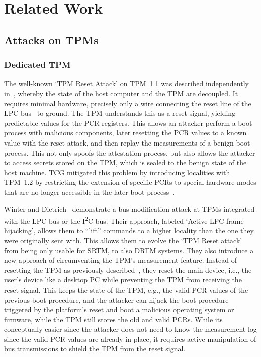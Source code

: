 
\chapter{Related Work}\label{chapter:related_work}

\section{Attacks on TPMs}

\subsection{Dedicated TPM}

The well-known `TPM Reset Attack' on TPM~1.1 was described independently in~\cite{kauerBernhard,sparks2007}, whereby the state of the host computer and the TPM are decoupled.
It requires minimal hardware, precisely only a wire connecting the reset line of the LPC bus~\cite{lpc} to ground.
The TPM understands this as a reset signal, yielding predictable values for the \ac{PCR} registers.
This allows an attacker perform a boot process with malicious components, later resetting the \ac{PCR} values to a known value with the reset attack, and then replay the measurements of a benign boot process.
This not only spoofs the attestation process, but also allows the attacker to access secrets stored on the TPM, which is sealed to the benign state of the host machine.
\ac{TCG} mitigated this problem by introducing localities with TPM~1.2 by restricting the extension of specific \acp{PCR} to special hardware modes that are no longer accessible in the later boot process~\cite{tpmResetMitigation}.

Winter and Dietrich~\cite{Winter2013} demonstrate a bus modification attack at TPMs integrated with the LPC bus or the I\textsuperscript{2}C bus.
Their approach, labeled `Active LPC frame hijacking', allows them to ``lift'' commands to a higher locality than the one they were originally sent with.
This allows them to evolve the `TPM Reset attack' from being only usable for \ac{SRTM}, to also \ac{DRTM} systems.
They also introduce a new approach of circumventing the TPM's measurement feature.
Instead of resetting the TPM as previously described~\cite{kauerBernhard,sparks2007}, they reset the main device, i.e., the user's device like a desktop PC while preventing the TPM from receiving the reset signal.
This keeps the state of the TPM, e.g., the valid \ac{PCR} values of the previous boot procedure, and the attacker can hijack the boot procedure triggered by the platform's reset and boot a malicious operating system or firmware, while the TPM still stores the old and valid PCRs.
While its conceptually easier since the attacker does not need to know the measurement log since the valid \ac{PCR} values are already in-place, it requires active manipulation of bus transmissions to shield the TPM from the reset signal.

